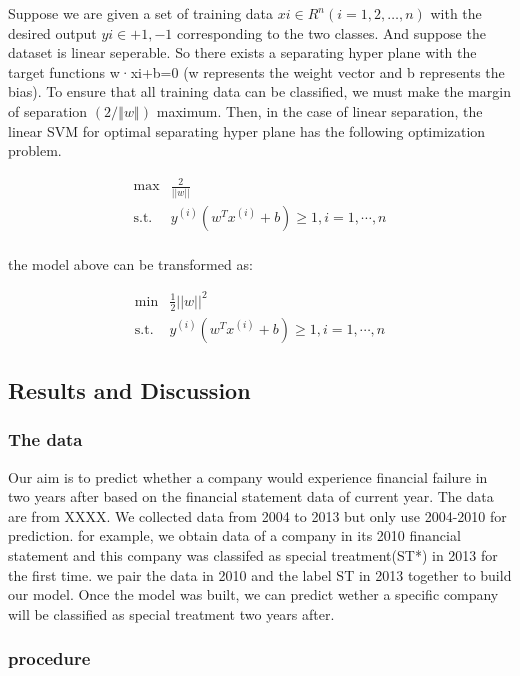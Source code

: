 \documentclass[]{article}
\begin{document}
Suppose we are given a set of training data $xi \in R^n(i=1,2,…,n)$ with
the desired output $yi∈{+1,-1}$ corresponding to the two classes. And
suppose the dataset is linear seperable. So there exists a separating
hyper plane with the target functions w·xi+b=0 (w represents the weight
vector and b represents the bias). To ensure that all training data can
be classified, we must make the margin of separation $(2/‖w‖)$ maximum.
Then, in the case of linear separation, the linear SVM for optimal
separating hyper plane has the following optimization problem.

\[
\begin{aligned}\max & \frac{2}{||w||}\\
\text{s.t.} & y^{(i)}(w^{T}x^{(i)}+b)\geq1,i=1,\cdots,n\\
\end{aligned}
\]

the model above can be transformed as:

\[
\begin{aligned}\min & \frac{1}{2}||w||^{2}\\
\text{s.t.} & y^{(i)}(w^{T}x^{(i)}+b)\geq1,i=1,\cdots,n
\end{aligned}
\]

\subsection{Results and Discussion}\label{results-and-discussion}

\subsubsection{The data}\label{the-data}

Our aim is to predict whether a company would experience financial
failure in two years after based on the financial statement data of
current year. The data are from XXXX. We collected data from 2004 to
2013 but only use 2004-2010 for prediction. for example, we obtain data
of a company in its 2010 financial statement and this company was
classifed as special treatment(ST*) in 2013 for the first time. we pair
the data in 2010 and the label ST in 2013 together to build our model.
Once the model was built, we can predict wether a specific company will
be classified as special treatment two years after.

\subsubsection{procedure}\label{procedure}
\end{document}
